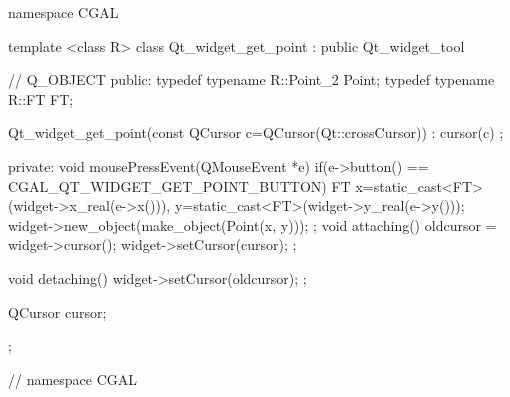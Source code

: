 \begin{ccExampleCode}
namespace CGAL {

template <class R>
class Qt_widget_get_point : public Qt_widget_tool
{
  //  Q_OBJECT
public:
  typedef typename R::Point_2	Point;
  typedef typename R::FT	FT;
  
  Qt_widget_get_point(const QCursor c=QCursor(Qt::crossCursor)) :
    cursor(c) {};
  
private:
  void mousePressEvent(QMouseEvent *e)
  {
    if(e->button() == CGAL_QT_WIDGET_GET_POINT_BUTTON)
    {
      FT
        x=static_cast<FT>(widget->x_real(e->x())),
        y=static_cast<FT>(widget->y_real(e->y()));
      widget->new_object(make_object(Point(x, y)));
    }
  };
  void attaching()
  {
    oldcursor = widget->cursor();
    widget->setCursor(cursor);
  };
  
  void detaching()
  {
    widget->setCursor(oldcursor);
  };

  QCursor cursor;
};

} // namespace CGAL
\end{ccExampleCode}








